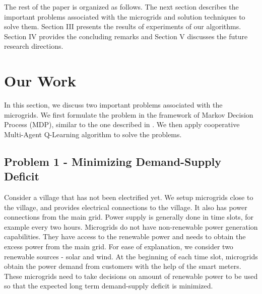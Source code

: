\documentclass[conference]{IEEEtran}
\begin{document}
The rest of the paper is organized as follows. The next section describes the important problems associated with the microgrids and solution techniques to solve them. Section III presents the results of experiments of our algorithms. Section IV provides the concluding remarks and Section V discusses the future research directions.




\section{Our Work}
In this section, we discuss two important problems associated with the microgrids. We first formulate the problem in the framework of Markov Decision Process (MDP), similar to the one described in \cite{goodmdp}. We then apply cooperative Multi-Agent Q-Learning algorithm to solve the problems.

\subsection{Problem 1 - Minimizing Demand-Supply Deficit}

Consider a village that has not been electrified yet. We setup microgrids close to the village, and provides electrical connections to the village. It also has power connections from the main grid. Power supply is generally done in time slots, for example every two hours. Microgrids do not have non-renewable power generation capabilities. They have access to the renewable power and needs to obtain the excess power from the main grid. For ease of explanation, we consider two renewable sources - solar and wind. At the beginning of each time slot, microgrids obtain the power demand from customers with the help of the smart meters. These microgrids need to take decisions on amount of renewable power to be used so that the expected long term demand-supply deficit is minimized.
\end{document}
